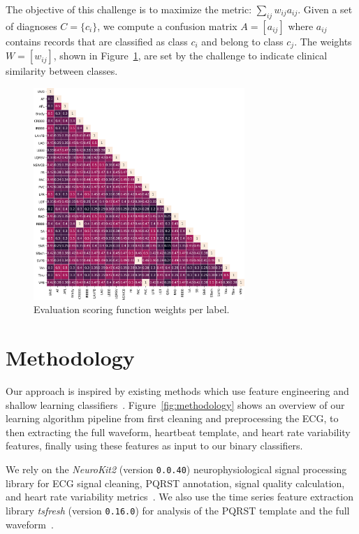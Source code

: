 \documentclass[twocolumn]{cinc}
\begin{document}
The objective of this challenge is to maximize the metric: $\sum_{ij} w_{ij} a_{ij}$.
Given a set of diagnoses $C = \{c_i\}$, we compute a confusion matrix $A = [a_{ij}]$ where $a_{ij}$ contains records that are classified as class $c_i$ and belong to class $c_j$.
The weights $W = [w_{ij}]$, shown in Figure~\ref{fig:dataset_labeldx}, are set by the challenge to indicate clinical similarity between classes.


\begin{figure}[ht]
  \centering
  \includegraphics[width=8cm]{fig/label_weights.png}
  \caption{Evaluation scoring function weights per label.}
  \label{fig:dataset_labeldx}
\end{figure}

\section{Methodology}

Our approach is inspired by existing methods which use feature engineering and shallow learning classifiers~\cite{goodwin_classification_2017}.
Figure~\ref{fig:methodology} shows an overview of our learning algorithm pipeline from first cleaning and preprocessing the ECG, to then extracting the full waveform, heartbeat template, and heart rate variability features, finally using these features as input to our binary classifiers.

We rely on the \emph{NeuroKit2} (version \texttt{0.0.40}) neurophysiological signal processing library for ECG signal cleaning, PQRST annotation, signal quality calculation, and heart rate variability metrics~\cite{neurokit2}.
We also use the time series feature extraction library \emph{tsfresh} (version \texttt{0.16.0}) for analysis of the PQRST template and the full waveform~\cite{CHRIST201872}.
\end{document}
